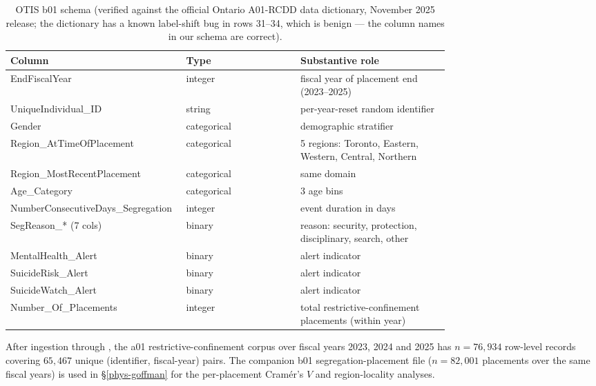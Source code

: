 \documentclass[article,shortnames,nojss]{jss}
\newcommand{\OTIS}{\textsf{OTIS}}
\begin{document}
\begin{table}[h]
\centering
\caption{\OTIS{} b01 schema (verified against the official Ontario
A01-RCDD data dictionary, November 2025 release; the dictionary has
a known label-shift bug in rows 31--34, which is benign --- the
column names in our schema are correct).}
\label{tab:otis-schema}
\footnotesize
\setlength{\tabcolsep}{4pt}
\begin{tabular}{@{}>{\ttfamily\raggedright\arraybackslash}p{0.40\linewidth} l p{0.34\linewidth}@{}}
\toprule
\normalfont\textbf{Column} & \textbf{Type} & \textbf{Substantive role} \\
\midrule
EndFiscalYear                          & integer     & fiscal year of placement end (2023--2025) \\
UniqueIndividual\_ID                   & string      & per-year-reset random identifier \\
Gender                                 & categorical & demographic stratifier \\
Region\_AtTimeOfPlacement              & categorical & 5 regions: Toronto, Eastern, Western, Central, Northern \\
Region\_MostRecentPlacement            & categorical & same domain \\
Age\_Category                          & categorical & 3 age bins \\
NumberConsecutiveDays\_Segregation     & integer     & event duration in days \\
SegReason\_* (7 cols)                  & binary      & reason: security, protection, disciplinary, search, other \\
MentalHealth\_Alert                    & binary      & alert indicator \\
SuicideRisk\_Alert                     & binary      & alert indicator \\
SuicideWatch\_Alert                    & binary      & alert indicator \\
Number\_Of\_Placements                 & integer     & total restrictive-confinement placements (within year) \\
\bottomrule
\end{tabular}
\end{table}

After ingestion through , the a01
restrictive-confinement corpus over fiscal years 2023, 2024 and
2025 has $n = 76{,}934$ row-level records covering $65{,}467$
unique (identifier, fiscal-year) pairs.  The companion b01
segregation-placement file ($n = 82{,}001$ placements over the
same fiscal years) is used in §\ref{phys-goffman} for the
per-placement Cramér's $V$ and region-locality analyses.
\end{document}

